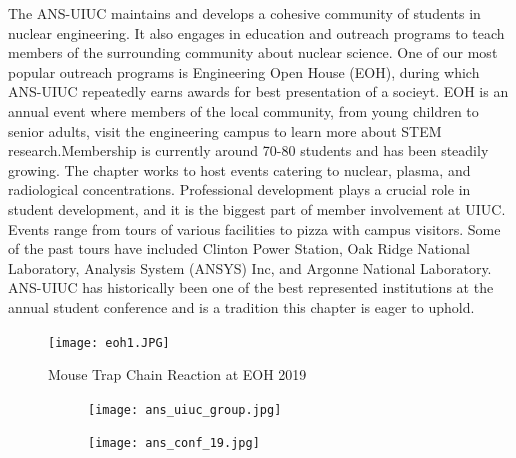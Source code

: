 The ANS-UIUC maintains and develops a cohesive community of students in nuclear engineering. It also engages in education and outreach programs to teach members of the surrounding community about nuclear science. One of our most popular outreach programs is Engineering Open House (EOH), during which ANS-UIUC repeatedly earns awards for best presentation of a socieyt. EOH is an annual event where members of the local community, from young children to senior adults, visit the engineering campus to learn more about STEM research.Membership is currently around 70-80 students and has been steadily growing. The chapter works to host events catering to nuclear, plasma, and radiological concentrations. Professional development plays a crucial role in student development, and it is the biggest part of member involvement at UIUC. Events range from tours of various facilities to pizza with campus visitors. Some of the past tours have included Clinton Power Station, Oak Ridge National Laboratory, Analysis System (ANSYS) Inc, and Argonne National Laboratory. ANS-UIUC has historically been one of the best represented institutions at the annual student conference and is a tradition this chapter is eager to uphold. 

\clearpage

\begin{figure}[H]
  \centering
  \texttt{[image: eoh1.JPG]}
  \caption{Mouse Trap Chain Reaction at EOH 2019}
\end{figure}

\begin{figure}[H]
  \centering
  \begin{subfigure}{0.5\textwidth}
    \centering
    \texttt{[image: ans\_uiuc\_group.jpg]}
  \end{subfigure}%
  \begin{subfigure}{0.5\textwidth}
    \centering
    \texttt{[image: ans\_conf\_19.jpg]}
  \end{subfigure}   
\end{figure} 

